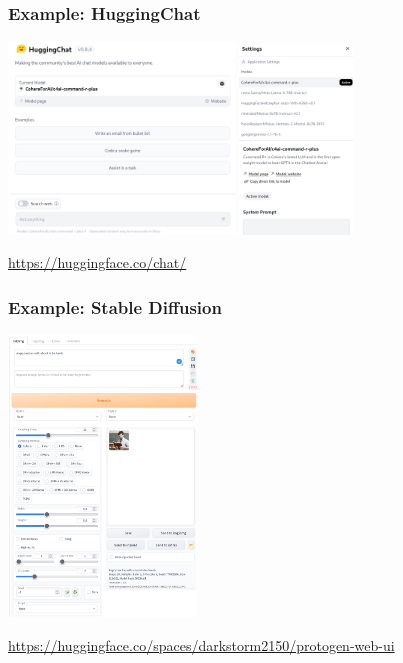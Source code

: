 \documentclass[17pt,aspectratio=169,hyperref={pdfusetitle,colorlinks,allcolors=olive}]{beamer}
\begin{document}
\begin{frame}[fragile]
\frametitle{Example: HuggingChat}

\begin{center}
  \includegraphics[width=6cm]{figs/huggingchat}
  \includegraphics[width=3cm]{figs/huggingchat-models}
\end{center}

\begin{flushright}
  {\small
    \url{https://huggingface.co/chat/}
  }
\end{flushright}
\end{frame}

\begin{frame}[fragile]
\frametitle{Example: Stable Diffusion}

\begin{center}
  \includegraphics[width=5cm]{figs/protogen-webui}
\end{center}

\begin{flushright}
  {\small
    \url{https://huggingface.co/spaces/darkstorm2150/protogen-web-ui}
  }
\end{flushright}
\end{frame}
\end{document}
